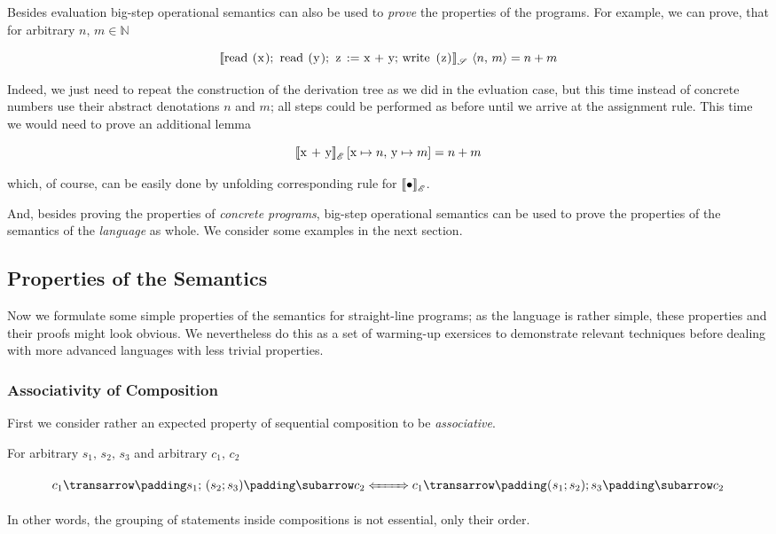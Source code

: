\FloatBarrier

Besides evaluation big-step operational semantics can also be used to \emph{prove} the properties of the programs. For example, we can prove, that for
arbitrary $n,\, m\in\mathbb{N}$ 

\[
\sembr{\llang{read (x); read (y); z := x + y; write (z)}}^\ph_\mathscr{S}\,\inbr{n,\,m}=n+m
\]

Indeed, we just need to repeat the construction of the derivation tree as we did in the evluation case, but this time instead of concrete numbers use
their abstract denotations $n$ and $m$; all steps could be performed as before until we arrive at the assignment rule. This time we would need to prove
an additional lemma

\[
\sembr{\llang{x + y}}^\ph_\mathscr{E}\,[\llang{x}\mapsto n,\,\llang{y}\mapsto m]=n+m
\]

which, of course, can be easily done by unfolding corresponding rule for $\sembr{\bullet}^\ph_\mathscr{E}$.

And, besides proving the properties of \emph{concrete programs}, big-step operational semantics can be used to prove the properties
of the semantics of the \emph{language} as whole. We consider some examples in the next section.

\subsection{Properties of the Semantics}

Now we formulate some simple properties of the semantics for straight-line programs; as the language is rather simple, these
properties and their proofs might look obvious. We nevertheless do this as a set of warming-up exersices to demonstrate
relevant techniques before dealing with more advanced languages with less trivial properties.

\subsubsection{Associativity of Composition}

First we consider rather an expected property of sequential composition to be \emph{associative}.

\begin{lemma} For arbitrary $s_1,\,s_2,\,s_3$ and arbitrary $c_1,\,c_2$

\[
\trans{c_1}{\llang{$s_1$; ($s_2$; $\,s_3$)}}{c_2}\xLeftrightarrow{\phantom{XXX}}{}\trans{c_1}{\llang{($s_1$; $\,s_2$); $\,s_3$}}{c_2}
\]


In other words, the grouping of statements inside compositions is not essential, only their order.
\end{lemma}

